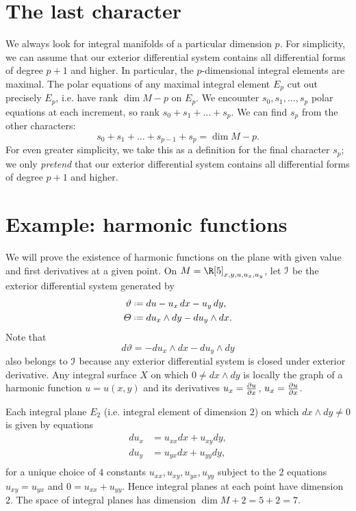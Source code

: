 \section{The last character}
We always look for integral manifolds of a particular dimension \(p\).
For simplicity, we can assume that our exterior differential system contains all differential forms of degree \(p+1\) and higher.
In particular, the \(p\)-dimensional integral elements are maximal.
The polar equations of any maximal integral element \(E_p\) cut out precisely \(E_p\), i.e. have rank \(\dim M - p\) on \(E_p\).
We encounter \(s_0, s_1,\dots,s_p\) polar equations at each increment, so rank \(s_0+s_1+\dots+s_p\).
We can find \(s_p\) from the other characters:
\[
s_0+s_1+\dots+s_{p-1}+s_p=\dim M - p.
\]
For even greater simplicity, we take this as a definition for the final character \(s_p\); we only \emph{pretend} that our exterior differential system contains all differential forms of degree \(p+1\) and higher.

\section{Example: harmonic functions}
We will prove the existence of harmonic functions on the plane with given value and first derivatives at a given point.
On \(M=\R[5]_{x,y,u,u_x,u_y}\), let \(\mathcal{I}\) be the exterior differential system generated by 
\begin{align*}
\vartheta & \defeq du-u_x \, dx - u_y \, dy, \\
\Theta &\defeq du_x \wedge dy - du_y \wedge dx.
\end{align*}
Note that
\[
d\vartheta = -du_x \wedge dx -du_y \wedge dy
\]
also belongs to \(\mathcal{I}\) because any exterior differential system is closed under exterior derivative.
Any integral surface \(X\) on which \(0 \ne dx \wedge dy\) is locally the graph of a harmonic function \(u=u(x,y)\) and its derivatives \(u_x = \pderiv{u}{x}\), \(u_x = \pderiv{u}{x}\).

Each integral plane \(E_2\) (i.e. integral element of dimension \(2\)) on which \(dx \wedge dy \ne 0\) is given by equations
\begin{align*}
du_x &= u_{xx} dx + u_{xy} dy, \\
du_y &= u_{yx} dx + u_{yy} dy, \\
\end{align*}
for a unique choice of \(4\) constants \(u_{xx}, u_{xy}, u_{yx}, u_{yy}\)
subject to the \(2\) equations \(u_{xy}=u_{yx}\) and \(0=u_{xx}+u_{yy}\).
Hence integral planes at each point have dimension \(2\).
The space of integral planes has dimension \(\dim M + 2 = 5+2=7\).

